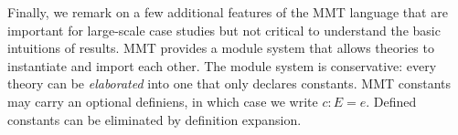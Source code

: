 Finally, we remark on a few additional features of the MMT language that are important for large-scale case studies but not critical to understand the basic intuitions of results.
MMT provides a module system that allows theories to instantiate and import each other. The module system is conservative: every theory can be \emph{elaborated} into one that only declares constants.
MMT constants may carry an optional definiens, in which case we write $c:E=e$.
Defined constants can be eliminated by definition expansion.


%
%

